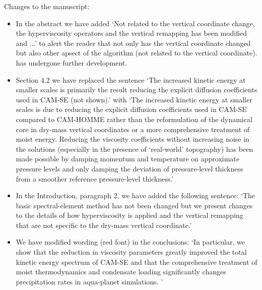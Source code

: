 \documentclass[11pt]{article}
\begin{document}
Changes to the manuscript: 
\begin{itemize}
\item In the abstract we have added `Not related to the vertical coordinate change, the hyperviscosity operators and the vertical remapping has been modified and ...' to alert the reader that not only has the vertical coordinate changed but also other apsect of the algorithm (not related to the vertical coordinate). has undergone further development.
\item Section 4.2 we have replaced the sentence `The increased kinetic energy at smaller scales is primarily the result reducing the explicit diffusion coefficients used in CAM-SE (not shown).' with `The increased kinetic energy at smaller scales is due to reducing the explicit diffusion coefficients used in CAM-SE compared to CAM-HOMME rather than the reformulation of the dynamical core in dry-mass vertical coordinates or a more comprehensive treatment of moist energy. Reducing the viscosity coefficients without increasing noise in the solutions (especially in the presence of `real-world' topography) has been made possible by damping momentum and temperature on approximate pressure levels and only damping the deviation of pressure-level thickness from a smoother reference pressure-level thickness.'
\item In the Introduction, paragraph 2, we have added the following sentence: `The basic spectral-element method has not been changed but we present changes to the details of how hyperviscosity is applied and the vertical remapping that are not specific to the dry-mass vertical coordinate.' 
\item We have modified wording (red font) in the conclusions: `In particular, we show that the reduction in viscosity parameters {\color{red}{(made possible by changes to the details of how hyperviscosity is applied)}} greatly improved the total kinetic energy spectrum of CAM-SE and that the comprehensive treatment of moist thermodynamics and condensate loading significantly changes precipitation rates in aqua-planet simulations. {\color{red}{These changes are not due to the dry-mass vertical coordinate per se but we argue that the comprehensive treatment of energy in the Earth system model as a whole is much simpler in a dry-mass vertical coordinate which stays fixed during parameterization updates.}}'


\end{itemize}
\end{document}
